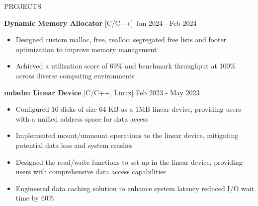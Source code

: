 \documentclass{resume} %
\begin{document}
\begin{rSection}{PROJECTS}

{\bf Dynamic Memory Allocator }{[C/C++] } \hfill Jan $2024$ - Feb $2024$
\begin{itemize}[itemsep = -4pt]
    \item Designed custom malloc, free, realloc; segregated free lists and footer optimization to improve memory management
    \item Achieved a utilization score of 69\% and benchmark throughput at 100\% across diverse computing environments
\end{itemize}


{\bf mdadm Linear Device }{[C/C++, Linux] } \hfill Feb $2023$ - May $2023$
\begin{itemize}[itemsep = -4pt]
    \item Configured 16 disks of size 64 KB as a 1MB linear device, providing users with a unified address space for data access
    \item Implemented mount/unmount operations to the linear device, mitigating potential data loss and system crashes
    \item Designed the read/write functions to set up in the linear device, providing users with comprehensive data access capabilities
    \item Engineered data caching solution to enhance system latency reduced I/O wait time by 60\%
\end{itemize}

\end{rSection}
\end{document}

